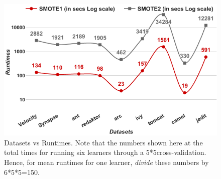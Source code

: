 \documentclass[10pt,conference]{IEEEtran}
\theoremstyle{break}
\theoremstyle{break}
\begin{document}
\begin{figure}[!htbp]
  \captionsetup{justification=centering}
  \includegraphics[width=\linewidth]{./fig/runtimes.png}
  \caption{Datasets vs Runtimes. Note that the numbers
  shown here at the total times for running six learners through a 5*5cross-validation. Hence, for mean
  runtimes for one learner, {\em divide} these numbers by 6*5*5=150.}
  \label{runtime}
\vspace{-0.7cm}
\end{figure}
\end{document}
